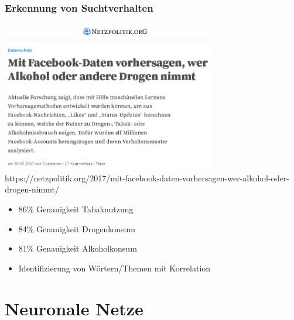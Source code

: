 \documentclass[12pt]{beamer}
\begin{document}
\begin{frame}
  \frametitle{Erkennung von Suchtverhalten}
   {
    \begin{center}
      \includegraphics[width=0.7\textwidth]{img/facebook_drogen.png} \\
      \tiny https://netzpolitik.org/2017/mit-facebook-daten-vorhersagen-wer-alkohol-oder-drogen-nimmt/
    \end{center}
  }
   {
    \begin{itemize}
      \item 86\% Genauigkeit Tabaknutzung
      \item 84\% Genauigkeit Drogenkonsum
      \item 81\% Genauigkeit Alkoholkonsum
      \item Identifizierung von Wörtern/Themen mit Korrelation
    \end{itemize}
  }
\end{frame}

\section{Neuronale Netze}
\subsection{}
\end{document}
